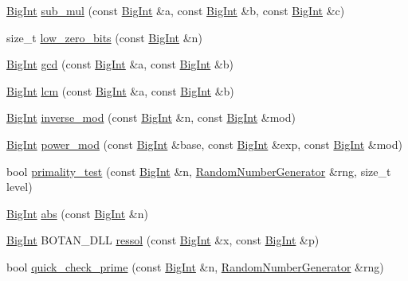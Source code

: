\begin{DoxyCompactItemize}
\item 
\hyperlink{classBotan_1_1BigInt}{Big\-Int} \hyperlink{namespaceBotan_adbe9fc87488f9f07191682cf0521e7f2}{sub\-\_\-mul} (const \hyperlink{classBotan_1_1BigInt}{Big\-Int} \&a, const \hyperlink{classBotan_1_1BigInt}{Big\-Int} \&b, const \hyperlink{classBotan_1_1BigInt}{Big\-Int} \&c)
\item 
size\-\_\-t \hyperlink{namespaceBotan_a4c81adea7adc0c4e075ee2cdd13cfb83}{low\-\_\-zero\-\_\-bits} (const \hyperlink{classBotan_1_1BigInt}{Big\-Int} \&n)
\item 
\hyperlink{classBotan_1_1BigInt}{Big\-Int} \hyperlink{namespaceBotan_ae2d4660d73dfdc39453650b15faa1ce6}{gcd} (const \hyperlink{classBotan_1_1BigInt}{Big\-Int} \&a, const \hyperlink{classBotan_1_1BigInt}{Big\-Int} \&b)
\item 
\hyperlink{classBotan_1_1BigInt}{Big\-Int} \hyperlink{namespaceBotan_a06a0629dbb2934e59ea43d8d3800fd84}{lcm} (const \hyperlink{classBotan_1_1BigInt}{Big\-Int} \&a, const \hyperlink{classBotan_1_1BigInt}{Big\-Int} \&b)
\item 
\hyperlink{classBotan_1_1BigInt}{Big\-Int} \hyperlink{namespaceBotan_a110d34f1182559c7de4a96973170e7f7}{inverse\-\_\-mod} (const \hyperlink{classBotan_1_1BigInt}{Big\-Int} \&n, const \hyperlink{classBotan_1_1BigInt}{Big\-Int} \&mod)
\item 
\hyperlink{classBotan_1_1BigInt}{Big\-Int} \hyperlink{namespaceBotan_a556f62337122fb57e18e8d8850eb4bf0}{power\-\_\-mod} (const \hyperlink{classBotan_1_1BigInt}{Big\-Int} \&base, const \hyperlink{classBotan_1_1BigInt}{Big\-Int} \&exp, const \hyperlink{classBotan_1_1BigInt}{Big\-Int} \&mod)
\item 
bool \hyperlink{namespaceBotan_ade3269fd3cd86b478c6c5f797e007e7e}{primality\-\_\-test} (const \hyperlink{classBotan_1_1BigInt}{Big\-Int} \&n, \hyperlink{classBotan_1_1RandomNumberGenerator}{Random\-Number\-Generator} \&rng, size\-\_\-t level)
\item 
\hyperlink{classBotan_1_1BigInt}{Big\-Int} \hyperlink{namespaceBotan_a481ae8e7fe0268600101ab74663f3f16}{abs} (const \hyperlink{classBotan_1_1BigInt}{Big\-Int} \&n)
\item 
\hyperlink{classBotan_1_1BigInt}{Big\-Int} B\-O\-T\-A\-N\-\_\-\-D\-L\-L \hyperlink{namespaceBotan_ac651190dc783005f94252856714a323a}{ressol} (const \hyperlink{classBotan_1_1BigInt}{Big\-Int} \&x, const \hyperlink{classBotan_1_1BigInt}{Big\-Int} \&p)
\item 
bool \hyperlink{namespaceBotan_a84349165e2e06442d77db64cdb76bfee}{quick\-\_\-check\-\_\-prime} (const \hyperlink{classBotan_1_1BigInt}{Big\-Int} \&n, \hyperlink{classBotan_1_1RandomNumberGenerator}{Random\-Number\-Generator} \&rng)

\end{DoxyCompactItemize}
